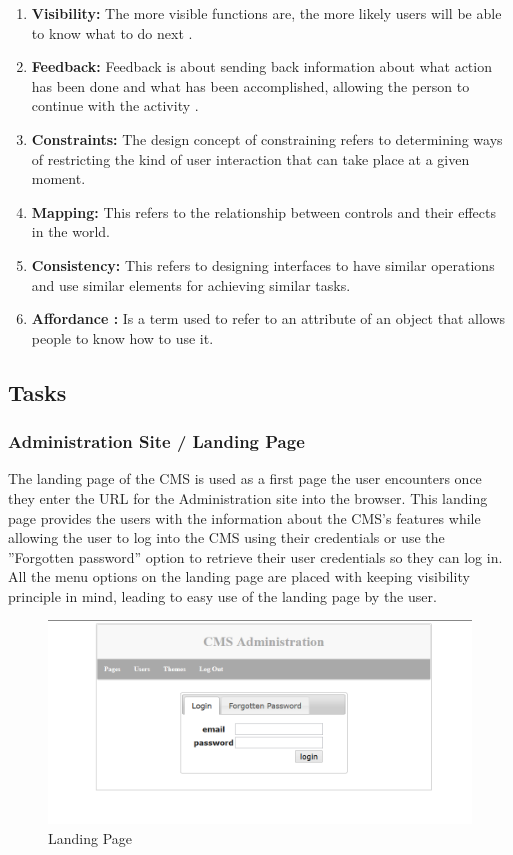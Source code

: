 \documentclass[12pt]{article}
\begin{document}
\begin{enumerate}
  \item \textbf{Visibility:} The more visible functions are, the more likely users will be able to know what to do next \cite{norman}. 
  \item \textbf{Feedback:} Feedback is about sending back information about what action has been done and what has been accomplished, allowing the person to continue with the activity .
  \item \textbf{Constraints:} The design concept of constraining refers to determining ways of restricting the kind of user interaction that can take place at a given moment.
  \item \textbf{Mapping:} This refers to the relationship between controls and their effects in the world.
  \item \textbf{Consistency:} This refers to designing interfaces to have similar operations and use similar elements for achieving similar tasks.
  \item \textbf{Affordance :} Is a term used to refer to an attribute of an object that allows people to know how to use it.
\end{enumerate}


\subsection{Tasks}

\subsubsection{Administration Site / Landing Page}
The landing page of the CMS is used as a first page the user encounters once they enter the URL for the Administration site into the browser. This landing page provides the users with the information about the CMS's features while allowing the user to log into the CMS using their credentials or use the ''Forgotten password'' option to retrieve their user credentials so they can log in. 
All the menu options on the landing page are placed with keeping visibility principle in mind, leading to easy use of the landing page by the user.

\begin{figure}[H]
 \centering
    \includegraphics[width=\textwidth,height=\textheight,keepaspectratio]{pics/adminLoginPage.png}
    \caption{Landing Page}
\end{figure}
\end{document}
